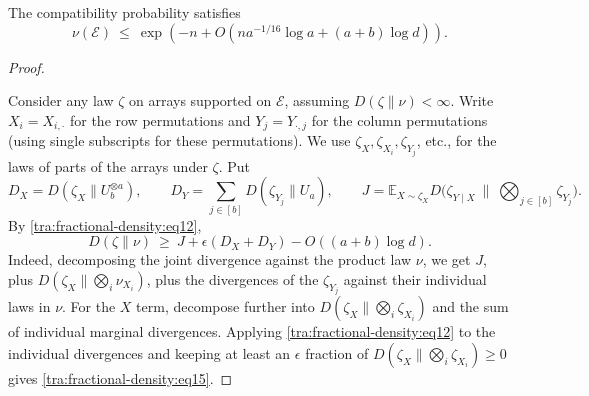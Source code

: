 \begin{lemma}\label{tra:fractional-density:compatibility}

\label{tra:fractional-density:compatibility-probability}
The compatibility probability satisfies
\begin{equation}
 \nu(\mathcal E)
 \ \le\ \exp\left(-n+O\left(n a^{-1/16}\log a+(a+b)\log d\right)\right).
 \label{tra:fractional-density:eq14}
\end{equation}

\end{lemma}\begin{proof}\label{tra:fractional-density:compatibility-proof}

\label{tra:fractional-density:entropy-decomposition-and-reveal}
Consider any law \(\zeta\) on arrays supported on \(\mathcal E\), assuming \(D(\zeta\|\nu)<\infty\). Write \(X_i=X_{i,\cdot}\) for the row permutations and \(Y_j=Y_{\cdot,j}\) for the column permutations (using single subscripts for these permutations). We use \(\zeta_X,\zeta_{X_i},\zeta_{Y_j}\), etc., for the laws of parts of the arrays under \(\zeta\). Put
\[
 D_X=D(\zeta_X\|U_b^{\otimes a}),\qquad
 D_Y=\sum_{j\in[b]}D(\zeta_{Y_j}\|U_a),\qquad
 J=\mathbb E_{X\sim\zeta_X}D\Big(\zeta_{Y\mid X}\ \Big\|\ \bigotimes_{j\in[b]}\zeta_{Y_j}\Big).
\]
By \eqref{tra:fractional-density:eq12},
\begin{equation}
 D(\zeta\|\nu)
 \ \ge\ J+\epsilon(D_X+D_Y)-O((a+b)\log d).
 \label{tra:fractional-density:eq15}
\end{equation}
Indeed, decomposing the joint divergence against the product law \(\nu\), we get \(J\), plus \(D(\zeta_X\| \bigotimes_i \nu_{X_i})\), plus the divergences of the \(\zeta_{Y_j}\) against their individual laws in \(\nu\). For the \(X\) term, decompose further into \(D(\zeta_X\| \bigotimes_i\zeta_{X_i})\) and the sum of individual marginal divergences. Applying \eqref{tra:fractional-density:eq12} to the individual divergences and keeping at least an \(\epsilon\) fraction of \(D(\zeta_X\| \bigotimes_i\zeta_{X_i})\ge 0\) gives \eqref{tra:fractional-density:eq15}.


\end{proof}
